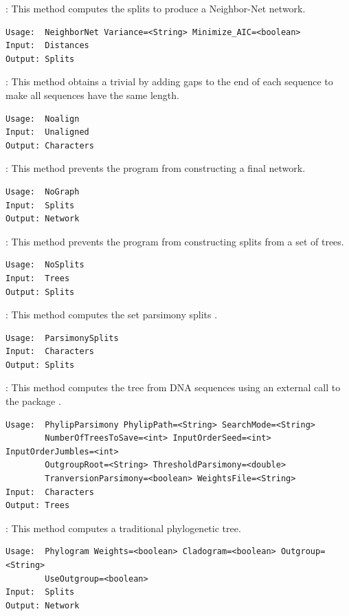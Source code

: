 \documentclass[11pt]{article}
\begin{document}
{}:
This method computes the  splits \cite{BryantMoulton2002}
to produce a Neighbor-Net network.
\begin{verbatim}
Usage:  NeighborNet Variance=<String> Minimize_AIC=<boolean>
Input:  Distances
Output: Splits
\end{verbatim}

{}:
This method obtains a trivial  by adding gaps to the end
of each sequence to make all sequences have the same length.
\begin{verbatim}
Usage:  Noalign
Input:  Unaligned
Output: Characters
\end{verbatim}

{}:
This method prevents the program from
constructing a final network.
\begin{verbatim}
Usage:  NoGraph
Input:  Splits
Output: Network
\end{verbatim}

{}:
This method prevents the program from constructing splits from a set of
trees.
\begin{verbatim}
Usage:  NoSplits
Input:  Trees
Output: Splits
\end{verbatim}

{}:
This method computes the set parsimony splits \cite{BandeltDress92}.
\begin{verbatim}
Usage:  ParsimonySplits
Input:  Characters
Output: Splits
\end{verbatim}

{}:
This method computes the  tree from DNA sequences using
an external call to the
 package \cite{Phylip}.
\begin{verbatim}
Usage:  PhylipParsimony PhylipPath=<String> SearchMode=<String>
        NumberOfTreesToSave=<int> InputOrderSeed=<int> InputOrderJumbles=<int>
        OutgroupRoot=<String> ThresholdParsimony=<double>
        TranversionParsimony=<boolean> WeightsFile=<String>
Input:  Characters
Output: Trees
\end{verbatim}

{}:
This method computes a traditional phylogenetic tree.
\begin{verbatim}
Usage:  Phylogram Weights=<boolean> Cladogram=<boolean> Outgroup=<String>
        UseOutgroup=<boolean>
Input:  Splits
Output: Network
\end{verbatim}
\end{document}
